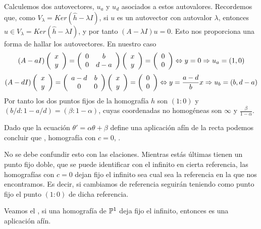 Calculemos dos autovectores, $u_a$ y $u_d$ asociados a estos autovalores. Recordemos que, como $V_{\lambda}= Ker(\widehat{h}-\lambda I)$, si $u$ es un autovector con autovalor $\lambda$, entonces $u\in V_{\lambda}= Ker(\widehat{h}-\lambda I)$, y por tanto $(A-\lambda I)u=0$. Esto nos proporciona una forma de hallar los autovectores. En nuestro caso
\begin{equation*}
	(A-a I)\left( \begin{array}{c}
	x\\
	y
	\end{array}\right)=\left( \begin{array}{cc}
	0&b\\
	0&d-a
	\end{array}\right)
	\left( \begin{array}{c}
	x\\
	y
	\end{array}\right)=\left( \begin{array}{c}
	0\\
	0
	\end{array}\right)\Leftrightarrow y=0\Rightarrow u_{a}=(1,0)
\end{equation*}
\begin{equation*}
	(A-d I)\left( \begin{array}{c}
	x\\
	y
	\end{array}\right)=\left( \begin{array}{cc}
	a-d&b\\
	0&0
	\end{array}\right)
	\left( \begin{array}{c}
	x\\
	y
	\end{array}\right)=\left( \begin{array}{c}
	0\\
	0
\end{array}\right)\Leftrightarrow y=\frac{a-d}{b}x\Rightarrow u_b=(b,d-a)
\end{equation*}
Por tanto los dos puntos fijos de la homografía $h$ son $(1:0)$ y $(b/d:1-a/d)=(\beta:1-\alpha)$, cuyas coordenadas no homogéneas son $\infty$ y $\frac{\beta}{1-\alpha}$. 

Dado que la ecuación $\theta'=\alpha\theta+\beta$ define una aplicación afín de la recta podemos concluir que , homografía con $c=0$, . 
\begin{obs}
	No se debe confundir esto con las elaciones. Mientras estás últimas tienen un punto fijo doble, que se puede identificar con el infinito en cierta referencia, las homografías con $c=0$ dejan fijo el infinito sea cual sea la referencia en la que nos encontramos. Es decir, si cambiamos de referencia seguirán teniendo como punto fijo el punto $(1:0)$ de dicha referencia.
\end{obs}
Veamos el , si una homografía de $\mathbb{P}^1$ deja fijo el infinito, entonces es una aplicación afín. 

